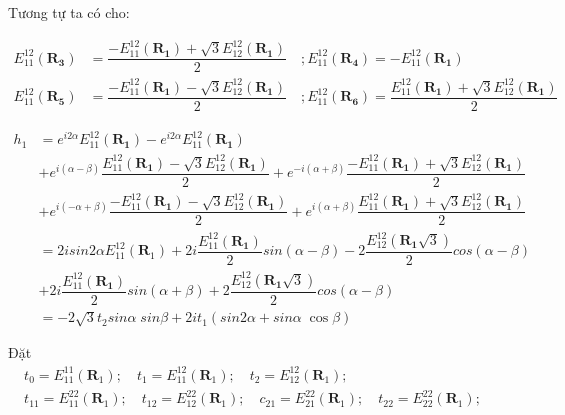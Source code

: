 \documentclass{article}
\begin{document}
Tương tự ta có cho:

\begin{align}
    E_{11}^{12}(\mathbf{R_3}) & =  \dfrac{ -E_{11}^{12}(\mathbf{R_1}) + \sqrt{3} E_{12}^{12}(\mathbf{R_1})}{2} \quad ;  E_{11}^{12}(\mathbf{R_4}) = - E_{11}^{12}(\mathbf{R_1}) \nonumber                                                 \\
    E_{11}^{12}(\mathbf{R_5}) & =  \dfrac{ -E_{11}^{12}(\mathbf{R_1}) - \sqrt{3} E_{12}^{12}(\mathbf{R_1})}{2} \quad ; E_{11}^{12}(\mathbf{R_6})  =  \dfrac{ E_{11}^{12}(\mathbf{R_1}) + \sqrt{3} E_{12}^{12}(\mathbf{R_1})}{2} \nonumber
\end{align}

\begin{align}
    h_1 & = e^{i2\alpha} E_{11}^{12}(\mathbf{R_1}) - e^{i2\alpha} E_{11}^{12}(\mathbf{R_1})   \nonumber                                                                                                                   \\
        & + e^{i(\alpha - \beta)}\dfrac{ E_{11}^{12}(\mathbf{R_1}) - \sqrt{3} E_{12}^{12}(\mathbf{R_1})}{2} + e^{-i(\alpha + \beta)}\dfrac{ -E_{11}^{12}(\mathbf{R_1}) + \sqrt{3} E_{12}^{12}(\mathbf{R_1})}{2} \nonumber \\
        & + e^{i(-\alpha + \beta)} \dfrac{ -E_{11}^{12}(\mathbf{R_1}) - \sqrt{3} E_{12}^{12}(\mathbf{R_1})}{2} + e^{i(\alpha+\beta)}\dfrac{ E_{11}^{12}(\mathbf{R_1}) + \sqrt{3} E_{12}^{12}(\mathbf{R_1})}{2} \nonumber  \\
        & = 2isin2\alpha E_{11}^{12}(\mathbf{R}_1) + 2i \dfrac{E_{11}^{12}(\mathbf{R_1})}{2} sin(\alpha-\beta) - 2\dfrac{E_{12}^{12}(\mathbf{R_1}\sqrt{3})}{2} cos(\alpha - \beta) \nonumber                              \\
        & +  2i \dfrac{E_{11}^{12}(\mathbf{R_1})}{2} sin(\alpha+\beta) + 2\dfrac{E_{12}^{12}(\mathbf{R_1}\sqrt{3})}{2} cos(\alpha - \beta) \nonumber                                                                      \\
        & = -2\sqrt{3} t_2 sin\alpha \; sin\beta + 2i t_1(sin2\alpha + sin\alpha\;\cos\beta) \nonumber
\end{align}


\clearpage

Đặt
\begin{align}
    t_0 = E_{11}^{11}(\mathbf{R}_1); \quad
    t_1 = E_{11}^{12}(\mathbf{R}_1); \quad
    t_2 = E_{12}^{12}(\mathbf{R}_1); \quad \nonumber \\
    t_{11} = E_{11}^{22}(\mathbf{R}_1); \quad
    t_{12} = E_{12}^{22}(\mathbf{R}_1); \quad
    c_{21} = E_{21}^{22}(\mathbf{R}_1); \quad
    t_{22} = E_{22}^{22}(\mathbf{R}_1); \quad \nonumber
\end{align}
\end{document}
